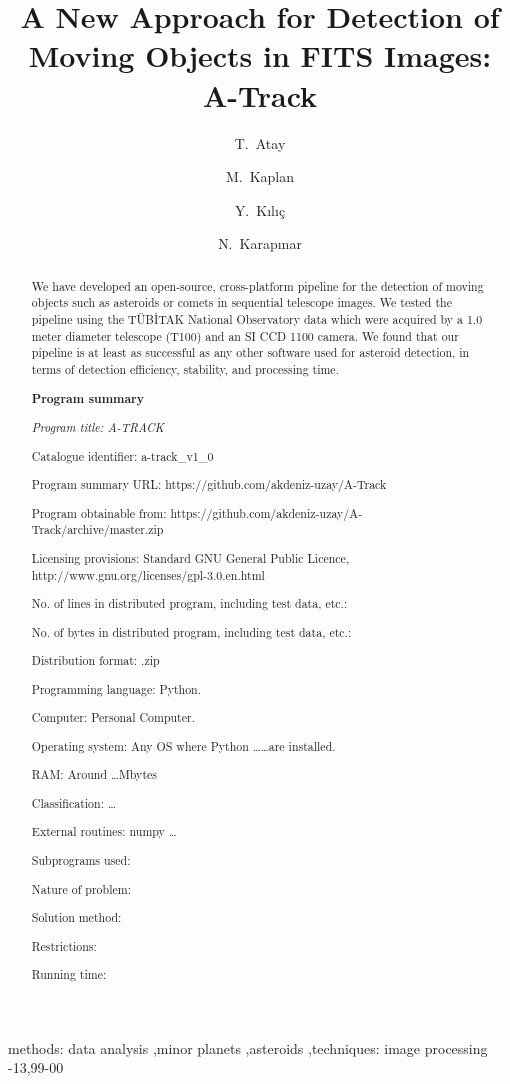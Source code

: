 \documentclass[review]{elsarticle}
\begin{document}
\begin{frontmatter}

\title{A New Approach for Detection of Moving Objects in FITS Images: A-Track}


\author[ubt]{T.~Atay}
\author[ubt]{M.~Kaplan}
\author[ubt]{Y.~K{\i}l{\i}\c{c}}
\author[ubt]{N.~Karap{\i}nar}

\address[ubt]{Akdeniz Universitesi, Fen Fakultesi, Uzay Bilimleri ve Teknolojileri Bolumu, Antalya, Turkiye}

\begin{abstract}
We have developed an open-source, cross-platform pipeline for the detection of moving objects such as asteroids or comets in sequential telescope images. We tested the pipeline using the T\"{U}B\.{I}TAK National Observatory data which were acquired by a 1.0 meter diameter telescope (T100) and an SI CCD 1100 camera. We found that our pipeline is at least as successful as any other software used for asteroid detection, in terms of detection efficiency, stability, and processing time.

{\bf Program summary}

{\em Program title: A-TRACK

Catalogue identifier: a-track\_v1\_0

Program summary URL: https://github.com/akdeniz-uzay/A-Track

Program obtainable from: https://github.com/akdeniz-uzay/A-Track/archive/master.zip

Licensing provisions: Standard GNU General Public Licence, http://www.gnu.org/licenses/gpl-3.0.en.html

No. of lines in distributed program, including test data, etc.: 

No. of bytes in distributed program, including test data, etc.: 

Distribution format: .zip

Programming language: Python.

Computer: Personal Computer.

Operating system: Any OS where Python \ldots\ldots are installed.

RAM: Around \ldots Mbytes

Classification: \ldots

External routines: numpy \ldots

Subprograms used: 

Nature of problem: 

Solution method:

Restrictions:

Running time:
}
\end{abstract}

\begin{keyword}
  methods: data analysis \sep minor planets \sep asteroids \sep techniques: image processing
  -13\sep  99-00
\end{keyword}

\end{frontmatter}
\end{document}
